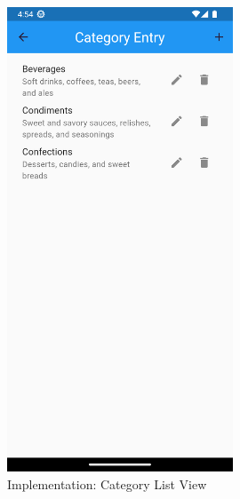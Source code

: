 \documentclass[../thesis.tex]{subfiles}
\begin{document}
\begin{figure}[H]
    \centering
    \includegraphics[width=0.60\textwidth]{images/CategoryScreen_List.png}
    \caption{Implementation: Category List View}
    \label{fig:CategoryScreen_List}
\end{figure}
\end{document}
